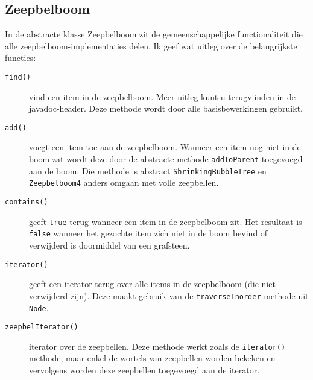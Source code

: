 \documentclass[12pt,hidelinks]{article}
\begin{document}
    \subsection{Zeepbelboom} 
    In de abstracte klasse Zeepbelboom zit de gemeenschappelijke functionaliteit die
    alle zeepbelboom-implementaties delen. Ik geef wat uitleg over de belangrijkste functies:
    \begin{description}
        \item[\tt find()] vind een item in de zeepbelboom. Meer uitleg kunt u terugviinden in de javadoc-header. Deze methode wordt door alle basisbewerkingen gebruikt.
        \item[\tt add()] voegt een item toe aan de zeepbelboom. Wanneer een item nog niet in de boom zat wordt deze door de abstracte methode {\tt addToParent} toegevoegd aan de boom.
            Die methode is abstract {\tt ShrinkingBubbleTree} en {\tt Zeepbelboom4} anders omgaan met volle zeepbellen.
        \item[\tt contains()] geeft {\tt true} terug wanneer een item in de zeepbelboom zit. Het resultaat is {\tt false} wanneer het gezochte item zich niet in de boom bevind of verwijderd is doormiddel van een grafsteen.
        \item[\tt iterator()] geeft een iterator terug over alle items in de zeepbelboom (die niet verwijderd zijn). Deze maakt gebruik van de {\tt traverseInorder}-methode uit {\tt Node}.
        \item[\tt zeepbelIterator()] iterator over de zeepbellen. Deze methode werkt zoals de {\tt iterator()} methode, maar enkel de wortels van zeepbellen worden bekeken
            en vervolgens worden deze zeepbellen toegevoegd aan de iterator.
    \end{description}
\end{document}
